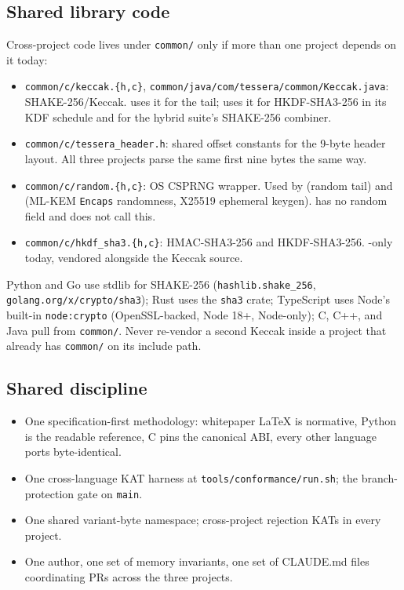 \subsection{Shared library code}

Cross-project code lives under \texttt{common/} only if more than one project depends on it today:

\begin{itemize}
\item \texttt{common/c/keccak.\{h,c\}}, \texttt{common/java/com/tessera/common/Keccak.java}: SHAKE-256/Keccak. \tesserahash{} uses it for the tail; \tesseraseal{} uses it for HKDF-SHA3-256 in its KDF schedule and for the hybrid suite's SHAKE-256 combiner.
\item \texttt{common/c/tessera\_header.h}: shared offset constants for the 9-byte header layout. All three projects parse the same first nine bytes the same way.
\item \texttt{common/c/random.\{h,c\}}: OS CSPRNG wrapper. Used by \tesseraid{} (random tail) and \tesseraseal{} (ML-KEM \texttt{Encaps} randomness, X25519 ephemeral keygen). \tesserahash{} has no random field and does not call this.
\item \texttt{common/c/hkdf\_sha3.\{h,c\}}: HMAC-SHA3-256 and HKDF-SHA3-256. \tesseraseal{}-only today, vendored alongside the Keccak source.
\end{itemize}

Python and Go use stdlib for SHAKE-256 (\texttt{hashlib.shake\_256}, \texttt{golang.org/x/crypto/sha3}); Rust uses the \texttt{sha3} crate; TypeScript uses Node's built-in \texttt{node:crypto} (OpenSSL-backed, Node 18+, Node-only); C, C++, and Java pull from \texttt{common/}. Never re-vendor a second Keccak inside a project that already has \texttt{common/} on its include path.

\subsection{Shared discipline}

\begin{itemize}
\item One specification-first methodology: whitepaper LaTeX is normative, Python is the readable reference, C pins the canonical ABI, every other language ports byte-identical.
\item One cross-language KAT harness at \texttt{tools/conformance/run.sh}; the branch-protection gate on \texttt{main}.
\item One shared variant-byte namespace; cross-project rejection KATs in every project.
\item One author, one set of memory invariants, one set of CLAUDE.md files coordinating PRs across the three projects.
\end{itemize}

